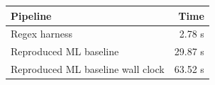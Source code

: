 \begin{tabular}{lr}
\toprule
Pipeline & Time \\
\midrule
Regex harness & 2.78 s \\
Reproduced ML baseline & 29.87 s \\
Reproduced ML baseline wall clock & 63.52 s \\
\bottomrule
\end{tabular}

